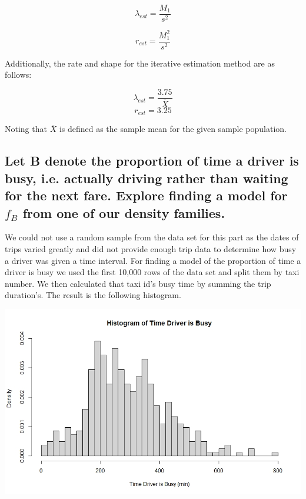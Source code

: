 \documentclass{article}
\numberwithin{equation}{section}
\begin{document}
\begin{equation}
    \lambda_{est} = \frac{M_1}{s^2}
\end{equation}

\begin{equation}
    r_{est} = \frac{M_1^2}{s^2}
\end{equation}

Additionally, the rate and shape for the iterative estimation method are as follows: 

\begin{equation}
    \lambda_{est} = \frac{3.75}{\bar{X}}
\end{equation}
\begin{equation}
     r_{est} = 3.25
\end{equation}

Noting that $\bar{X}$ is defined as the sample mean for the given sample population.

\newpage

\newpage

\subsection{Let B denote the proportion of time a driver is busy, i.e. actually driving rather than waiting for the next fare. Explore finding a model for $f_B$ from one of our density families.}

We could not use a random sample from the data set for this part as the dates of trips varied greatly and did not provide enough trip data to determine how busy a driver was given a time interval.  For finding a model of the proportion of time a driver is busy we used the first 10,000 rows of the data set and split them by taxi number.  We then calculated that taxi id's busy time by summing the trip duration's. The result is the following histogram.
\begin{center}
    \includegraphics[scale=0.5]{isBusy_hist.jpeg}\\
\end{center}
\end{document}
